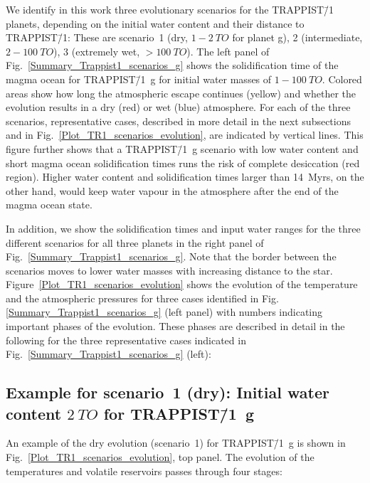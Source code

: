 \documentclass[oneside,twocolumn]{article}
\begin{document}
We identify in this work three evolutionary scenarios for the TRAPPIST\=/1 planets, depending on the initial water content and their distance to TRAPPIST\=/1: These are scenario~1 (dry, $1-\SI{2}{TO}$ for planet g), 2 (intermediate, $2-\SI{100}{TO}$), 3 (extremely wet, $>\SI{100}{TO}$). The left panel of Fig.~\ref{Summary_Trappist1_scenarios_g} shows the solidification time of the magma ocean for TRAPPIST\=/1~g for initial water masses of $1-\SI{100}{TO}$.
Colored areas show how long the atmospheric escape continues (yellow) and whether the evolution results in a dry (red) or wet (blue) atmosphere.
For each of the three scenarios, representative cases, described in more detail in the next subsections and in Fig.~\ref{Plot_TR1_scenarios_evolution}, are indicated by vertical lines. 
This figure further shows that a TRAPPIST\=/1~g scenario with low water content and short magma ocean solidification times runs the risk of complete desiccation (red region). 
Higher water content and solidification times larger than 14~Myrs, on the other hand, would keep water vapour in the atmosphere after the end of the magma ocean state.

In addition, we show the solidification times and input water ranges for the three different scenarios for all three planets in the right panel of Fig.~\ref{Summary_Trappist1_scenarios_g}. 
Note that the border between the scenarios moves to lower water masses with increasing distance to the star.
Figure~\ref{Plot_TR1_scenarios_evolution} shows the evolution of the temperature and the atmospheric pressures for three cases identified in Fig.~ \ref{Summary_Trappist1_scenarios_g} (left panel) with numbers indicating important phases of the evolution.
These phases are described in detail in the following for the three representative cases indicated in Fig.~\ref{Summary_Trappist1_scenarios_g} (left):

\subsection*{Example for scenario~1 (dry): Initial water content $\SI{2}{TO}$ for TRAPPIST\=/1~g}

An example of the dry evolution (scenario~1) for TRAPPIST\=/1~g is shown in Fig.~\ref{Plot_TR1_scenarios_evolution}, top panel. The evolution of the temperatures and volatile reservoirs passes through four stages:
\end{document}
